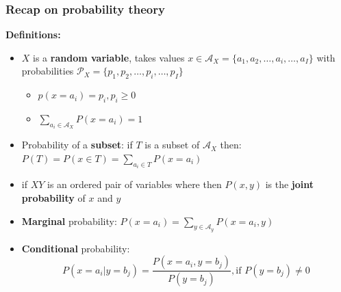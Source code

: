 \documentclass{beamer}
\newcommand{\bi}{\begin{itemize}}
\newcommand{\ei}{\end{itemize}}
\newcommand{\bis}{\begin{itemize}[<+->]}
\newcommand{\eis}{\end{itemize}}
\begin{document}
\begin{frame}
	\frametitle{Recap on probability theory}
    \textbf{Definitions:}
    \bis
    \item $X$ is a \textbf{random variable}, takes values $x\in\mathcal{A}_X=
        \{a_1,a_2,\hdots,a_i,\hdots,a_I\}$ with probabilities 
        $\mathcal{P}_X=\{p_1,p_2,\hdots,p_i,\hdots,p_I\}$
        \bi
        \item $p(x=a_i)=p_i, p_i \geq 0$
        \item $\sum_{a_i\in\mathcal{A}_X}P(x=a_i)=1$
        \ei
    \item Probability of a \textbf{subset}:
    if $T$ is a subset of $\mathcal{A}_X$ then:
    $P(T) = P(x\in T) = \sum_{a_i\in T}P(x=a_i)$
    \item if $XY$ is an ordered pair of variables where 
    then $P(x,y)$ is the \textbf{joint probability} of $x$ and $y$
    \item \textbf{Marginal} probability:
    $P(x=a_i) = \sum_{y\in\mathcal{A}_y} P(x=a_i,y)$
    \item \textbf{Conditional} probability:
    $$P(x=a_i|y=b_j) = \frac{P(x=a_i,y=b_j)}{P(y=b_j)}, \text{if $P(y=b_j)\neq0$}$$
    \eis
\end{frame}
\end{document}
